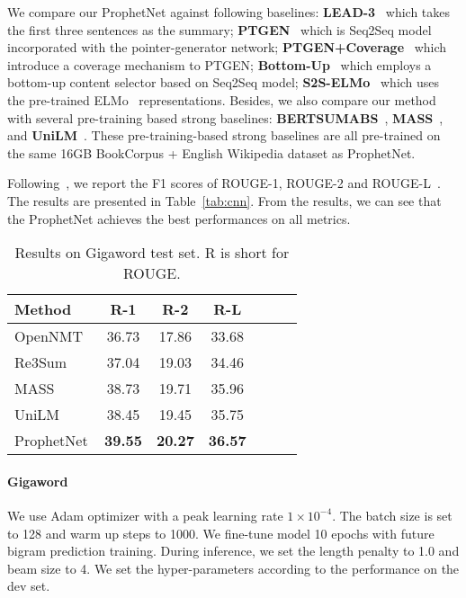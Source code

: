 \documentclass[11pt,a4paper]{article}
\begin{document}
We compare our ProphetNet against following baselines:
\textbf{LEAD-3}~\cite{nallapati2016abstractive} which takes the first three sentences as the summary;
\textbf{PTGEN}~\cite{see2017get} which is Seq2Seq model incorporated with the pointer-generator network;
\textbf{PTGEN+Coverage}~\cite{see2017get} which introduce a coverage mechanism to PTGEN;
\textbf{Bottom-Up}~\cite{gehrmann2018bottom} which employs a bottom-up content selector based on Seq2Seq model;
\textbf{S2S-ELMo}~\cite{edunov2019pre} which uses the pre-trained ELMo~\cite{peters2018deep} representations.
Besides, we also compare our method with several pre-training based strong baselines: \textbf{BERTSUMABS}~\cite{liu2019text}, \textbf{MASS}~\cite{song2019mass}, and \textbf{UniLM}~\cite{dong2019unified}. 
These pre-training-based strong baselines are all pre-trained on the same 16GB BookCorpus + English Wikipedia dataset as ProphetNet. 

Following~\citet{see2017get}, we report the F1 scores of ROUGE-1, ROUGE-2 and ROUGE-L~\cite{lin2004rouge}.~\citet{du2017learning}
The results are presented in Table~\ref{tab:cnn}.
From the results, we can see that the ProphetNet achieves the best performances on all metrics.


\begin{table}[th] 
\small
\begin{center}
  \begin{tabular}{lcccccl} 
    \toprule
    Method & R-1 & R-2 & R-L \\
    \midrule
 OpenNMT~\cite{klein2017opennmt} & 36.73 & 17.86 & 33.68 \\
Re3Sum~\cite{cao2018retrieve} & 37.04 & 19.03 & 34.46 \\
MASS~\cite{song2019mass} & 38.73 & 19.71 & 35.96 \\
 UniLM~\cite{dong2019unified} & 38.45  & 19.45 &   35.75\\
 \hline
 ProphetNet &   \textbf{39.55}  & \textbf{20.27}   & \textbf{36.57}\\
  \bottomrule
\end{tabular}
\end{center}
\caption{Results on Gigaword test set. R is short for ROUGE.}\label{tab:gigaword}
\end{table}

\paragraph{Gigaword} 
We use Adam optimizer with a peak learning rate $1 \times 10^{-4}$.
The batch size is set to 128 and warm up steps to 1000. We fine-tune model 10 epochs with future bigram prediction training.
During inference, we set the length penalty to 1.0 and beam size to 4. We set the hyper-parameters according to the performance on the dev set.
\end{document}
